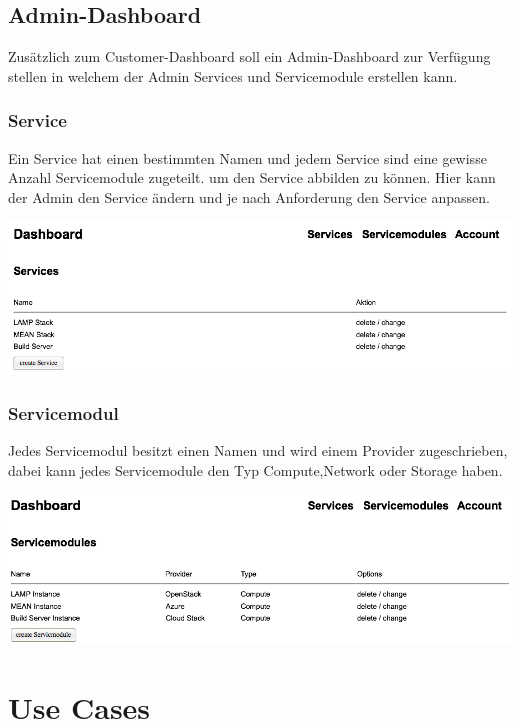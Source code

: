 \documentclass[11pt]{scrartcl}
\begin{document}
\subsection{Admin-Dashboard}
Zusätzlich zum Customer-Dashboard soll ein Admin-Dashboard zur Verfügung stellen 
in welchem der Admin Services und Servicemodule erstellen kann.

\subsubsection{Service}
Ein Service hat einen bestimmten Namen und jedem Service sind eine gewisse 
Anzahl Servicemodule zugeteilt. um den Service abbilden zu können.
Hier kann der Admin den Service ändern und je nach Anforderung den Service 
anpassen.

\includegraphics[width=\textwidth]{homescreen_admin}

\subsubsection{Servicemodul}
Jedes Servicemodul besitzt einen Namen und wird einem Provider zugeschrieben, 
dabei kann jedes Servicemodule den Typ Compute,Network oder Storage haben.

\includegraphics[width=\textwidth]{servicemodules_admin}

\section{Use Cases}
\end{document}
